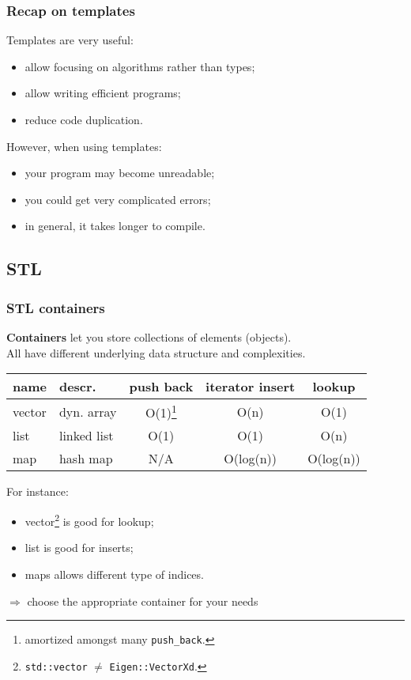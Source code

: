 \documentclass{beamer}
\newcommand{\code}[1]{{\color{cgreen}\texttt{#1}}}
\begin{document}
\begin{frame}[fragile]
\frametitle{Recap on templates}
 Templates are very useful:
 \begin{itemize}
  \item allow focusing on algorithms rather than types;
  \item allow writing efficient programs;
  \item reduce code duplication.
 \end{itemize}
 However, when using templates:
 \begin{itemize}
  \item your program may become unreadable;
  \item you could get very complicated errors;
  \item in general, it takes longer to compile.
 \end{itemize}
\end{frame}

\subsection{STL}
 
\begin{frame}[fragile]
 \frametitle{STL containers}
 \textbf{Containers} let you store collections of elements (objects). \\
 All have different underlying data structure and complexities.
 \begin{center}
 \begin{tabular}{l|lccc}
  \hline
  name	 & descr.		& push back 	& iterator insert	& lookup \\
  \hline
  vector & dyn. array 		& O(1)\footnote{amortized amongst many \code{push\_back}.}	      	& O(n)		& O(1) \\
  list	 & linked list 		& O(1)		& O(1)		& O(n) \\
  map	 & hash map		& N/A		& O(log(n))	& O(log(n))
 \end{tabular}
 \end{center}
 For instance: 
 \begin{itemize}
  \item vector\footnote{\code{std::vector} $\neq$ \code{Eigen::VectorXd}.} is good for lookup;
  \item list is good for inserts;
  \item maps allows different type of indices.
 \end{itemize}
 $\Rightarrow$ choose the appropriate container for your needs
\end{frame}
\end{document}

